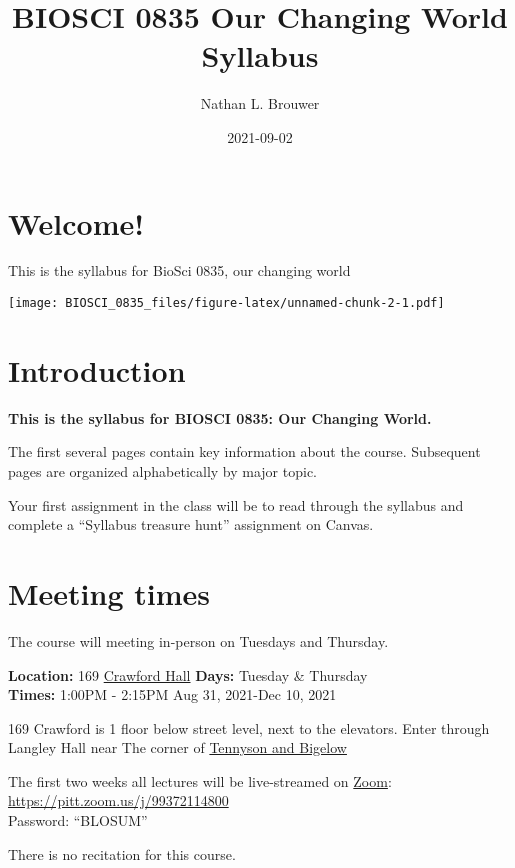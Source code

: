 \documentclass[
]{book}
\title{BIOSCI 0835 Our Changing World Syllabus}
\author{Nathan L. Brouwer}
\date{2021-09-02}
\begin{document}
\maketitle

{
\setcounter{tocdepth}{1}
\tableofcontents
}
\hypertarget{welcome}{%
\chapter{Welcome!}\label{welcome}}

This is the syllabus for BioSci 0835, our changing world

\texttt{[image: BIOSCI\_0835\_files/figure-latex/unnamed-chunk-2-1.pdf]}

\hypertarget{intro}{%
\chapter{Introduction}\label{intro}}

\textbf{This is the syllabus for BIOSCI 0835: Our Changing World.}

The first several pages contain key information about the course. Subsequent pages are organized alphabetically by major topic.

Your first assignment in the class will be to read through the syllabus and complete a ``Syllabus treasure hunt'' assignment on Canvas.

\hypertarget{meeting-times}{%
\chapter{Meeting times}\label{meeting-times}}

The course will meeting in-person on Tuesdays and Thursday.

\textbf{Location:} 169 \href{https://calendar.pitt.edu/crawford_hall_909\#.YSZMWdPYq3I}{Crawford Hall}
\textbf{Days:} Tuesday \& Thursday\\
\textbf{Times:} 1:00PM - 2:15PM
Aug 31, 2021-Dec 10, 2021

169 Crawford is 1 floor below street level, next to the elevators. Enter through Langley Hall near The corner of \href{https://goo.gl/maps/ay3KxznH1u4VisWo8}{Tennyson and Bigelow}

The first two weeks all lectures will be live-streamed on \href{https://pitt.zoom.us/j/99372114800}{Zoom}: \url{https://pitt.zoom.us/j/99372114800}\\
Password: ``BLOSUM''

There is no recitation for this course.
\end{document}
